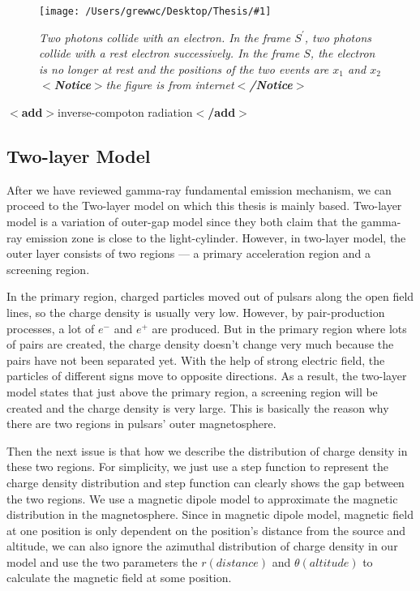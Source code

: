 \documentclass[12pt]{report}
\newcommand{\mycaption}[1]{\caption{\textit{\footnotesize #1}}}
\newcommand{\singleFig}[3]{
 \begin{figure}[!ht]
  \centering
  \texttt{[image: /Users/grewwc/Desktop/Thesis/\#1]}
  \mycaption{#3}
  \label{fig: #1}
 \end{figure} 
}
\newcommand{\add}[1]{
  $<$\textbf{add}$>$#1$<$\textbf{/add}$>$
}
\newcommand{\Notice}[1]{
  $<$\textbf{Notice}$>$#1$<$\textbf{/Notice}$>$
}
\begin{document}
          \vspace{1cm}
          \singleFig{inverse_compton_time_interval}{0.45}{Two photons collide with an electron. 
            In the frame $S^{\prime}$, two photons collide with a rest electron successively.
            In the frame $S$, the electron is no longer at rest and the positions of the two events 
            are $x_1$ and $x_2$ \Notice{the figure is from internet}}





          \add{inverse-compoton radiation}



        \subsection{Two-layer Model}
          After we have reviewed gamma-ray fundamental emission mechanism, we can proceed to
          the Two-layer model on which this thesis is mainly based. Two-layer model is a 
          variation of outer-gap model since they both claim that the gamma-ray emission zone
          is close to the light-cylinder. However, in two-layer model, the outer layer 
          consists of two regions --- a primary acceleration region and a screening region. 

          In the primary region, charged particles moved out of pulsars along the open field lines, 
          so the charge density is usually very low. 
          However, by pair-production processes, a lot of $e^{-}$ and $e^{+}$ are produced. 
          But in the primary region where lots of pairs are created, the charge density doesn't 
          change very much because the pairs have not been separated yet. With the help of strong 
          electric field, the particles of different signs move to opposite directions. 
          As a result, the two-layer model states that just above the primary region, a screening 
          region will be created and the charge density is very large. This is basically the reason why 
          there are two regions in pulsars' outer magnetosphere.

          Then the next issue is that how we describe the distribution of charge density in these two regions. 
          For simplicity, we just use a step function to represent the charge density distribution and step function 
          can clearly shows the gap between the two regions. We use a magnetic dipole model to approximate the 
          magnetic distribution in the magnetosphere. Since in magnetic dipole model, magnetic field at one position is 
          only dependent on the position's distance from the source and altitude, we can also ignore the azimuthal 
          distribution of charge density in our model and use the two parameters
          the $r (distance)$ and $\theta (altitude)$ to calculate the magnetic field at some position.
\end{document}
